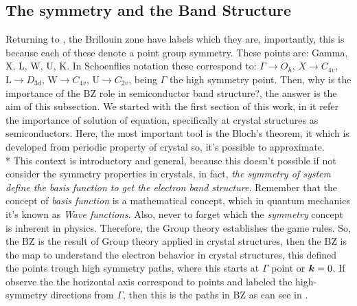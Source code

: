 \subsection{The symmetry and the Band Structure}
\label{subsec:chapter-2-brillouin-bandstructure}
\vspace{-10mm}
Returning to , the Brillouin zone have labels which they are, importantly, this is because  each of these denote a point group symmetry. These points are:  Gamma, X, L, W, U, K.  In Schoenflies notation these correspond to: $\Gamma\to O_{h}$, $X\to C_{4v}$, $\mathrm{L}\to D_{3d}$, $\mathrm{W}\to C_{4v}$, $\mathrm{U}\to C_{2v}$, being $\Gamma$ the high symmetry point. Then, why is the importance of the \gls{BZ} role in semiconductor band structure?, the answer is the aim of this subsection. We started with the first section of this work, in it refer the importance of solution of \sch  equation, specifically at crystal structures as semiconductors. Here, the most important tool is the Bloch's theorem, it which is developed from periodic property of crystal  so, it's possible to approximate.\\*
This context is introductory and general, because this doesn't possible if  not consider the symmetry properties in crystals, in fact, \emph{the symmetry of system define the basis function to get the electron band structure}\cite{dresselhaus2007group,cardona2005fundamentals,parmenter1955symmetry,butcher2013crystalline}.  Remember that the concept of \emph{basis function} is a mathematical concept, which in quantum mechanics it's known as \emph{Wave functions}. Also, never to forget which the \emph{symmetry} concept is inherent in physics. Therefore, the Group theory establishes the game rules. 
So, the \gls{BZ} is the result of Group theory applied in crystal structures, then the \gls{BZ} is the map to understand the electron behavior in crystal structures, this defined the \ks points trough high symmetry paths, where this starts at $\Gamma$ point or $\boldsymbol{k} =0$.  If observe the  the horizontal axis correspond to \ks points and labeled the high-symmetry directions from $\Gamma$, then this is the \ks paths in \gls{BZ} as can see in . 


